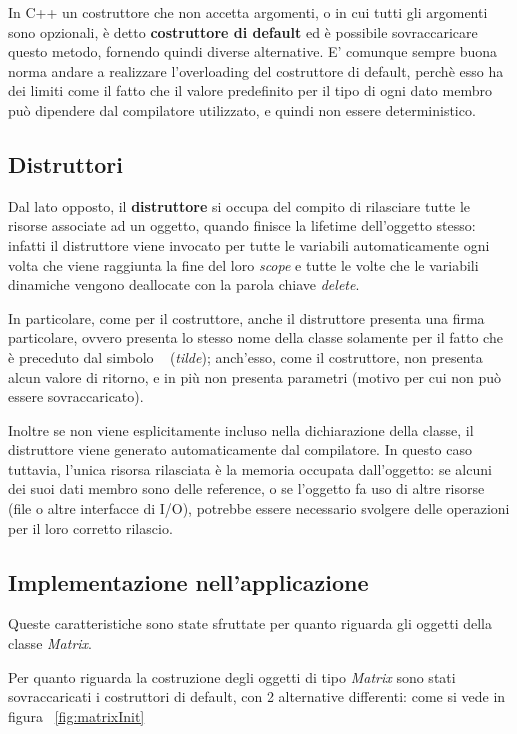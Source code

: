 In C++ un costruttore che non accetta argomenti, o in cui tutti gli argomenti sono opzionali, è detto \textbf{costruttore di default} ed è possibile sovraccaricare questo metodo, fornendo quindi diverse alternative. E' comunque sempre buona norma andare a realizzare l'overloading del costruttore di default, perchè esso ha dei limiti come il fatto che il valore predefinito per il tipo di ogni dato membro può dipendere dal compilatore utilizzato, e quindi non essere deterministico.

\subsection{Distruttori}
Dal lato opposto, il \textbf{distruttore} si occupa del compito di rilasciare tutte le risorse associate ad un oggetto, quando finisce la lifetime dell'oggetto stesso: infatti il distruttore viene invocato per tutte le variabili automaticamente ogni volta che viene raggiunta la fine del loro \textit{scope} e tutte le volte che le variabili dinamiche vengono deallocate con la parola chiave \textit{delete}.

In particolare, come per il costruttore, anche il distruttore presenta una firma particolare, ovvero presenta lo stesso nome della classe solamente per il fatto che è preceduto dal simbolo ~ (\textit{tilde}); anch'esso, come il costruttore, non presenta alcun valore di ritorno, e in più non presenta parametri (motivo per cui non può essere sovraccaricato).

Inoltre se non viene esplicitamente incluso nella dichiarazione della classe, il distruttore viene generato automaticamente dal compilatore. In questo caso tuttavia, l’unica risorsa rilasciata è la memoria occupata dall’oggetto: se alcuni dei suoi dati membro sono delle reference, o se l’oggetto fa uso di altre risorse (file o altre interfacce di I/O), potrebbe essere necessario svolgere delle operazioni per il loro corretto rilascio.

\subsection{Implementazione nell'applicazione}
Queste caratteristiche sono state sfruttate per quanto riguarda gli oggetti della classe \textit{Matrix}.

Per quanto riguarda la costruzione degli oggetti di tipo \textit{Matrix} sono stati sovraccaricati i costruttori di default, con 2 alternative differenti: come si vede in figura ~\ref{fig:matrixInit}

